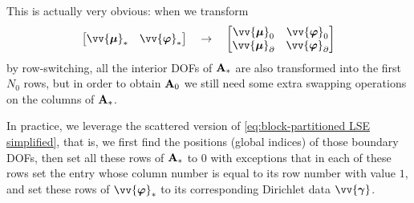 	This is actually very obvious:  when we transform
	\[\begin{bmatrix}
		\vv{\bm{\mu}}_* & \vv{\bm{\varphi}}_*
	\end{bmatrix} \quad\rightarrow\quad 
	\begin{bmatrix}
		\vv{\bm{\mu}}_0 & \vv{\bm{\varphi}}_0\\		
		\vv{\bm{\mu}}_\partial & \vv{\bm{\varphi}}_\partial
	\end{bmatrix} \]
	by row-switching, all the interior DOFs of $\mathbf{A}_*$ are also transformed 
	into the first $N_0$ rows, but in order to obtain $\mathbf{A}_0$ we still need 
	some extra swapping operations on the columns of $\mathbf{A}_*$.
	
	In practice, we leverage the scattered version of
	\eqref{eq:block-partitioned LSE simplified}, that is, we first find the 
	positions (global indices) of those boundary DOFs, then set all	these rows 
	of $\mathbf{A}_*$ to $0$ with exceptions that in each of these rows set the entry 
	whose column number is equal to its row number with value $1$, and set 
	these rows of  $\vv{\bm{\varphi}}_*$ to its corresponding Dirichlet 
	data $\vv{\bm{\gamma}}$.
	

